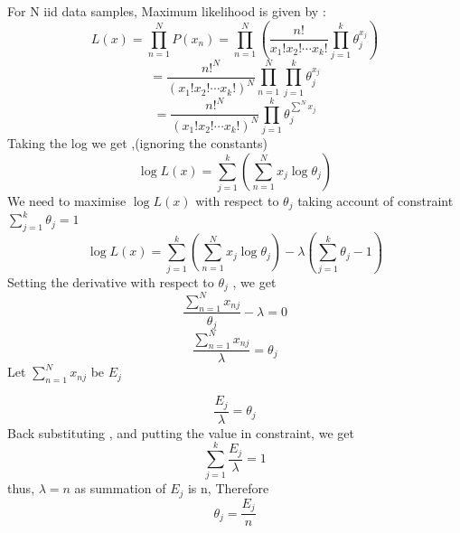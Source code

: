 \documentclass[twoside,10pt]{article}
\begin{document}
For N iid data samples, Maximum likelihood is given by :
\begin{equation} \nonumber
L(x) = \prod_{n=1}^{N} P(x_n)  =\prod_{n=1}^{N}  (\frac{n!}{x_1!x_2!\cdots x_k!}\prod_{j=1}^{k}\theta_j^{x_j})
\end{equation}
\begin{equation} \nonumber
=\frac{n!^N}{(x_1!x_2!\cdots x_k!)^N} \prod_{n=1}^{N}\prod_{j=1}^{k}\theta_j^{x_j}
\end{equation}
\begin{equation} \nonumber
=\frac{n!^N}{(x_1!x_2!\cdots x_k!)^N}\prod_{j=1}^{k}\theta_j^{\sum^{N} x_j}
\end{equation}
Taking the log we get ,(ignoring the constants)
\begin{equation} \nonumber
\log L(x) =\sum_{j=1}^{k}(\sum_{n=1}^{N} x_j  \log\theta_j) 
\end{equation}
We need to maximise $ \log L(x) $ with respect to  $\theta_j $ taking account of constraint  
 $\sum_{j=1}^k\theta_j=1$ \\
\begin{equation} \nonumber
\log L(x) =\sum_{j=1}^{k}(\sum_{n=1}^{N} x_j  \log\theta_j) - \lambda (\sum_{j=1}^k\theta_j-1)
\end{equation}
Setting the derivative with respect to $\theta_j$ , we get 
\begin{equation} \nonumber
\frac{\sum_{n=1}^{N} x_{nj}}{\theta_j} -  \lambda  = 0 
\end{equation}
\begin{equation} \nonumber
\frac{\sum_{n=1}^{N} x_{nj}}{ \lambda} = {\theta_j}  
\end{equation}
Let $ \sum_{n=1}^{N} x_{nj} $ be $ E_j $

\begin{equation} \nonumber
\frac{E_j}{ \lambda} = {\theta_j}  
\end{equation}
Back substituting , and putting the value in constraint, we get
\begin{equation} \nonumber
\sum_{j=1}^k \frac{E_j}{ \lambda} =1 
\end{equation}
thus, $\lambda = n $  as summation of $E_j$  is n, Therefore\\ 
\begin{equation} \nonumber
 \theta_j = \frac {E_j} {n} 
\end{equation}
\end{document}
